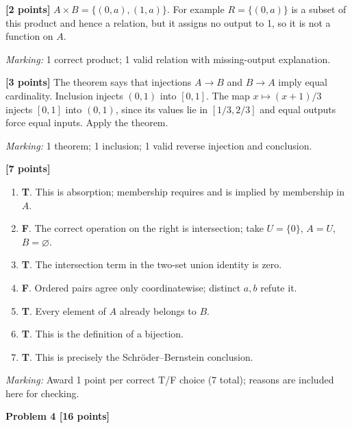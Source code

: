 \documentclass[12pt,letterpaper]{article}
\newcommand{\problemheading}[2][5\baselineskip]{\Needspace{#1}\par\noindent\hspace*{-0.625in}\textbf{#2}\par\nobreak\vspace{0.3em}}
\begin{document}
\begin{description}[font=\normalfont,leftmargin=1.2em,labelsep=0.4em]
\item[(a)] \textbf{[2 points]} $A\times B=\{(0,a),(1,a)\}$. For example $R=\{(0,a)\}$ is a subset of this product and hence a relation, but it assigns no output to 1, so it is not a function on $A$.
\par\textit{Marking:} 1 correct product; 1 valid relation with missing-output explanation.
\item[(b)] \textbf{[3 points]} The theorem says that injections $A\to B$ and $B\to A$ imply equal cardinality. Inclusion injects $(0,1)$ into $[0,1]$. The map $x\mapsto(x+1)/3$ injects $[0,1]$ into $(0,1)$, since its values lie in $[1/3,2/3]$ and equal outputs force equal inputs. Apply the theorem.
\par\textit{Marking:} 1 theorem; 1 inclusion; 1 valid reverse injection and conclusion.
\item[(c)] \textbf{[7 points]} \begin{enumerate}[label=(\roman*)]\item \textbf{T}. This is absorption; membership requires and is implied by membership in $A$.\item \textbf{F}. The correct operation on the right is intersection; take $U=\{0\}$, $A=U$, $B=\varnothing$.\item \textbf{T}. The intersection term in the two-set union identity is zero.\item \textbf{F}. Ordered pairs agree only coordinatewise; distinct $a,b$ refute it.\item \textbf{T}. Every element of $A$ already belongs to $B$.\item \textbf{T}. This is the definition of a bijection.\item \textbf{T}. This is precisely the Schr\"oder--Bernstein conclusion.\end{enumerate}
\par\textit{Marking:} Award 1 point per correct T/F choice (7 total); reasons are included here for checking.
\end{description}
\vspace{0.65em}
\problemheading[\dimexpr 3\baselineskip+4\baselineskip\relax]{Problem 4 [16 points]}
\end{document}
